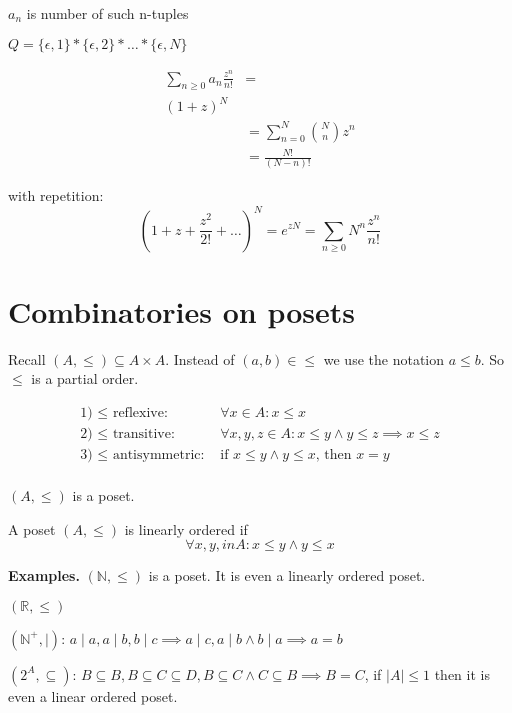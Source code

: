 $a_n $ is number of such n-tuples

$Q = \{\epsilon,1\} * \{\epsilon,2\} * \ldots * \{\epsilon,N\} $

\begin{align*}
  \sum_{n\geq 0} a_n \frac{z^n}{n!} &= \\
    (1+z)^N \\
    &= \sum_{n=0} ^{N} {N \choose n} z^n \\
    &= \frac{N!}{(N-n)!} 
\end{align*}

with repetition: 
\[
  (1+z+ \frac{z^2}{2!} + \ldots)^N 
    = e^{zN} = \sum_{n\geq 0} N^n \frac{z^n}{n!}
\]

\section{Combinatories on posets}

Recall $(A, \leq) \subseteq A \times A$. 
Instead of $(a,b) \in \leq$ we use the notation $a \leq b$. So $\leq$ is a partial order.

\begin{align*}
  \text{1) $\leq$ reflexive: } &
    \forall x \in A: x \leq x \\
  \text{2) $\leq$ transitive: } &
    \forall x,y,z \in A: x \leq y \land y \leq z \implies x \leq z \\
  \text{3) $\leq$ antisymmetric: } &
    \text{if } x \leq y \land y \leq x \text{, then } x = y \\
\end{align*}

$(A,\leq)$ is a poset.

A poset $(A,\leq)$ is linearly ordered if 
\[
  \forall x,y, in A: x \leq y \land y \leq x
\]

\textbf{Examples.}
$(\mathbb{N}, \leq)$ is a poset. It is even a linearly ordered poset.

$(\mathbb{R}, \leq)$

$(\mathbb{N}^{+}, \mid)$: $a \mid a, a\mid b, b \mid c \implies a\mid c, a\mid b \land b\mid a \implies a = b$

$(2^A, \subseteq)$: $ B \subseteq B, B \subseteq C \subseteq D, B\subseteq C \land C \subseteq B \implies B = C$, if $|A|\leq 1$ then it is even a linear ordered poset. 

